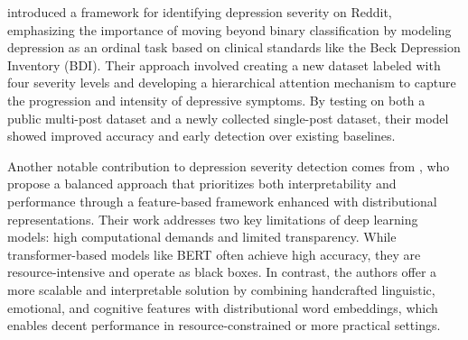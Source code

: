 \cite{Naseem_2022} introduced a framework for identifying depression severity on Reddit, emphasizing the importance of moving beyond binary classification by modeling depression as an ordinal task based on clinical standards like the Beck Depression Inventory (BDI). Their approach involved creating a new dataset labeled with four severity levels and developing a hierarchical attention mechanism to capture the progression and intensity of depressive symptoms. By testing on both a public multi-post dataset and a newly collected single-post dataset, their model showed improved accuracy and early detection over existing baselines.

Another notable contribution to depression severity detection comes from \cite{Munoz_2023}, who propose a balanced approach that prioritizes both interpretability and performance through a feature-based framework enhanced with distributional representations. Their work addresses two key limitations of deep learning models: high computational demands and limited transparency. While transformer-based models like BERT often achieve high accuracy, they are resource-intensive and operate as black boxes. In contrast, the authors offer a more scalable and interpretable solution by combining handcrafted linguistic, emotional, and cognitive features with distributional word embeddings, which enables decent performance in resource-constrained or more practical settings.